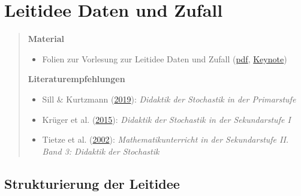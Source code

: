 \documentclass[
]{scrbook}
\providecommand{\tightlist}{%
  \setlength{\itemsep}{0pt}\setlength{\parskip}{0pt}}
\theoremstyle{definition}
\theoremstyle{definition}
\theoremstyle{definition}
\theoremstyle{definition}
\theoremstyle{remark}
\begin{document}
\hypertarget{leitidee-daten-und-zufall}{%
\chapter{Leitidee Daten und Zufall}\label{leitidee-daten-und-zufall}}

\begin{quote}
\textbf{Material}

\begin{itemize}
\tightlist
\item
  Folien zur Vorlesung zur Leitidee Daten und Zufall (\href{files/Stoffdidaktik-WiSe2223-Kap14.pdf}{pdf}, \href{files/Stoffdidaktik-WiSe2223-Kap14.key}{Keynote})
\end{itemize}

\textbf{Literaturempfehlungen}

\begin{itemize}
\tightlist
\item
  Sill \& Kurtzmann (\protect\hyperlink{ref-Sill2019}{2019}): \emph{Didaktik der Stochastik in der Primarstufe}
\item
  Krüger et al. (\protect\hyperlink{ref-Kruger2015}{2015}): \emph{Didaktik der Stochastik in der Sekundarstufe I}
\item
  Tietze et al. (\protect\hyperlink{ref-Tietze:2002}{2002}): \emph{Mathematikunterricht in der Sekundarstufe II. Band 3: Didaktik der Stochastik}
\end{itemize}
\end{quote}

\hypertarget{strukturierung-der-leitidee-daten-und-zufall}{%
\section{Strukturierung der Leitidee}\label{strukturierung-der-leitidee-daten-und-zufall}}
\end{document}
